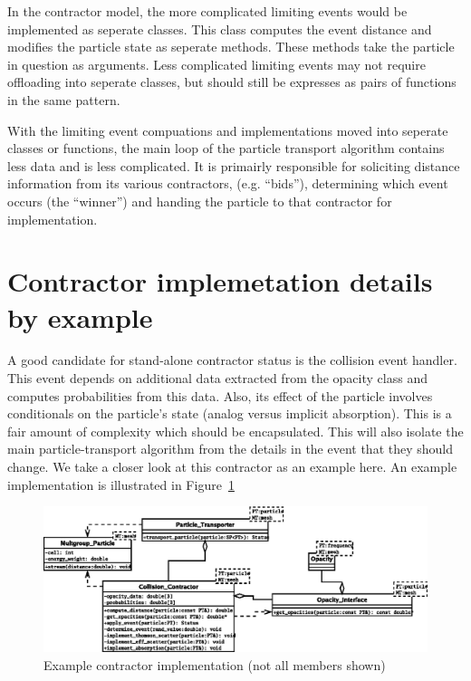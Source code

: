 \documentclass[memo]{ResearchNote}
\begin{document}
In the contractor model, the more complicated limiting events would be
implemented as seperate classes. This class computes the event
distance and modifies the particle state as seperate methods. These
methods take the particle in question as arguments. Less complicated
limiting events may not require offloading into seperate classes, but
should still be expresses as pairs of functions in the same pattern.

With the limiting event compuations and implementations moved into
seperate classes or functions, the main loop of the particle transport
algorithm contains less data and is less complicated. It is primairly
responsible for soliciting distance information from its various
contractors, (e.g. ``bids''), determining which event occurs (the
``winner'') and handing the particle to that contractor for
implementation.

\section{Contractor implemetation details by example}

A good candidate for stand-alone contractor status is the collision
event handler. This event depends on additional data extracted from
the opacity class and computes probabilities from this data. Also,
its effect of the particle involves conditionals on the particle's
state (analog versus implicit absorption). This is a fair amount of
complexity which should be encapsulated. This will also isolate the
main particle-transport algorithm from the details in the event that
they should change. We take a closer look at this contractor as an
example here. An example implementation is illustrated in
Figure~\ref{fig:collision_contractor}

\begin{center}
  \begin{figure}
    \includegraphics[width=6.5in]{figures/collision_contractor.eps}
    \caption{Example contractor implementation (not all members shown)} 
    \label{fig:collision_contractor}
  \end{figure}
\end{center}
\end{document}
